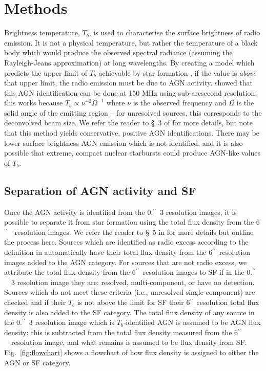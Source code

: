 \documentclass[usenatbib,fleqn,letters]{mnras}
\newcommand{\sarc}{$^{\prime\prime}\!\!$}
\begin{document}
\section{Methods}

Brightness temperature, $T_b$, is used to characterise the surface brightness of radio emission. It is not a physical temperature, but rather the temperature of a black body  which would produce the observed spectral radiance (assuming the Rayleigh-Jeans approximation) at long wavelengths. By creating a model which predicts the upper limit of $T_b$ achievable by star formation \citep[based on][]{condon_radio_1992}, if the value is \textit{above} that upper limit, the radio emission must be due to AGN activity.   showed that this AGN identification can be done at 150 MHz using sub-arcsecond resolution; this works because $T_b\propto\nu^{-2}\Omega^{-1}$ where $\nu$ is the observed frequency and $\Omega$ is the solid angle of the emitting region -- for unresolved sources, this corresponds to the deconvolved beam size. We refer the reader to \S~3 of  for more details, but note that this method yields conservative, positive AGN identifications. There may be lower surface brightness AGN emission which is not identified, and it is also possible \citep[although unlikely, according to][]{condon_radio_1992} that extreme, compact nuclear starbursts could produce AGN-like values of $T_b$. 

\subsection{Separation of AGN activity and SF}
Once the AGN activity is identified from the 0.\sarc\ 3 resolution images, it is possible to separate it from star formation using the total flux density from the 6\sarc\ \ resolution images. We refer the reader to \S~5 in  for more details but outline the process here. Sources which are identified as radio excess according to the definition in  automatically have their total flux density from the 6\sarc\ resolution images added to the AGN category. For sources that are not radio excess, we attribute the total flux density from the 6\sarc\ resolution images to SF if in the 0.\sarc\ \ 3 resolution image they are: resolved, multi-component, or have no detection. Sources which do not meet these criteria (i.e., unresolved single component) are checked and if their $T_b$ is not above the limit for SF their 6\sarc\ resolution total flux density is also added to the SF category. The total flux density of any source in the 0.\sarc\ 3 resolution image which is $T_b$-identified AGN is assumed to be AGN flux density; this is subtracted from the total flux density measured from the 6\sarc\ \ resolution image, and what remains is assumed to be flux density from SF. Fig.~\ref{fig:flowchart} shows a flowchart of how flux density is assigned to either the AGN or SF category. 
\end{document}
